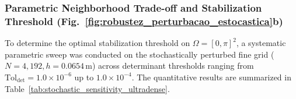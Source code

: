 \documentclass[preprint,12pt]{elsarticle}
\begin{document}
\subsubsection{Parametric Neighborhood Trade-off and Stabilization Threshold (Fig.~\ref{fig:robustez_perturbacao_estocastica}b)}
\label{subsubsec:parametric_tradeoff}

To determine the optimal stabilization threshold on $\Omega = [0, \pi]^2$, a systematic parametric sweep was conducted on the stochastically perturbed fine grid ($N = 4{,}192, h = 0.0654$\,m) across determinant thresholds ranging from $\mathrm{Tol}_{\mathrm{det}} = 1.0 \times 10^{-6}$ up to $1.0 \times 10^{-4}$. The quantitative results are summarized in Table~\ref{tab:stochastic_sensitivity_ultradense}.

\begin{table}[!htbp]
\centering
\caption{Parametric error sensitivity, support neighborhood size $K_{\mathrm{avg}}$, and placement matrix conditioning as a function of determinant threshold $\mathrm{Tol}_{\mathrm{det}}$ for the stochastically perturbed fine grid ($N = 4{,}192, h = 0.0654$\,m) over $\Omega = [0, \pi]^2$.}
\label{tab:stochastic_sensitivity_ultradense}
\end{table}
\end{document}
